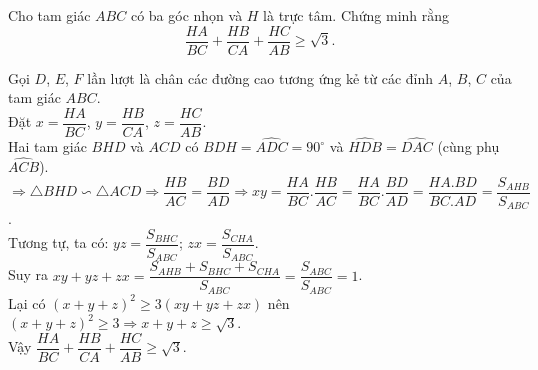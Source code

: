 \begin{ex}%
    Cho tam giác $ABC$ có ba góc nhọn và $H$ là trực tâm. Chứng minh rằng $$\dfrac{HA}{BC}+\dfrac{HB}{CA}+\dfrac{HC}{AB} \geq \sqrt{3}.$$
\loigiai
    {
     \begin{center}
    \end{center}
    Gọi $D$, $E$, $F$ lần lượt là chân các đường cao tương ứng kẻ từ các đỉnh $A$, $B$, $C$ của tam giác $ABC$.\\
    Đặt $x=\dfrac{HA}{BC}$, $y=\dfrac{HB}{CA}$, $z=\dfrac{HC}{AB}$.\\
    Hai tam giác $BHD$ và $ACD$ có $\widehat{BDH}=\widehat{ADC}=90^\circ$ và $\widehat{HDB}=\widehat{DAC}$ (cùng phụ $\widehat{ACB}$).\\
    $\Rightarrow \triangle BHD \backsim \triangle ACD \Rightarrow \dfrac{HB}{AC}=\dfrac{BD}{AD} \Rightarrow xy=\dfrac{HA}{BC}.\dfrac{HB}{AC}=\dfrac{HA}{BC}.\dfrac{BD}{AD}=\dfrac{HA.BD}{BC.AD}=\dfrac{S_{AHB}}{S_{ABC}}$.\\
    Tương tự, ta có: $yz=\dfrac{S_{BHC}}{S_{ABC}}$; $zx=\dfrac{S_{CHA}}{S_{ABC}}$.\\
    Suy ra $xy+yz+zx=\dfrac{S_{AHB}+S_{BHC}+S_{CHA}}{S_{ABC}}=\dfrac{S_{ABC}}{S_{ABC}}=1$.\\
    Lại có $(x+y+z)^2 \geq 3(xy+yz+zx)$ nên $(x+y+z)^2 \geq 3 \Rightarrow x+y+z \geq \sqrt{3}$.\\
    Vậy $\dfrac{HA}{BC}+\dfrac{HB}{CA}+\dfrac{HC}{AB} \geq \sqrt{3}$.
    }
\end{ex}

